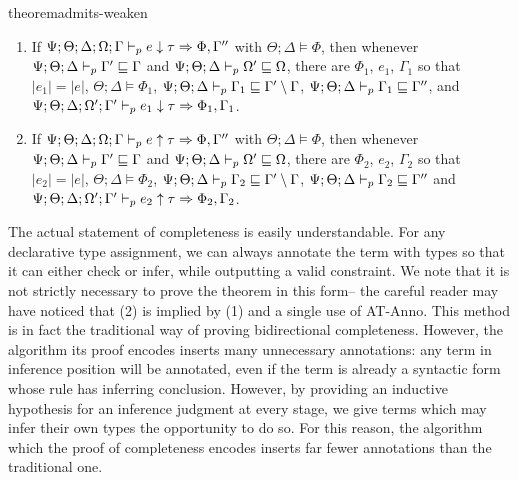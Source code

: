 \begin{restatable}{theorem}{admits-weaken}
~\begin{enumerate}
  \item If $\Psi ; \Theta ; \Delta ; \Omega ; \Gamma \vdash_p e \downarrow \tau \Rightarrow \Phi,\Gamma''$ with $\Theta ; \Delta \vDash \Phi$, then whenever $\Psi ; \Theta ; \Delta \vdash_p \Gamma' \sqsubseteq \Gamma$ and $\Psi ; \Theta ; \Delta \vdash_p \Omega' \sqsubseteq \Omega$, there are $\Phi_1$, $e_1$, $\Gamma_1$ so that $|e_1| = |e|$, $\Theta ; \Delta \vDash \Phi_1$, $\Psi ; \Theta ; \Delta \vdash_p \Gamma_1 \sqsubseteq \Gamma' \setminus \Gamma$, $\Psi ; \Theta ; \Delta \vdash_p \Gamma_1 \sqsubseteq \Gamma''$, and $\Psi ; \Theta ; \Delta ; \Omega' ; \Gamma' \vdash_p e_1 \downarrow \tau \Rightarrow \Phi_1,\Gamma_1$.
  \item If $\Psi ; \Theta ; \Delta ; \Omega ; \Gamma \vdash_p e \uparrow \tau \Rightarrow \Phi,\Gamma''$ with $\Theta ; \Delta \vDash \Phi$, then whenever $\Psi ; \Theta ; \Delta \vdash_p \Gamma' \sqsubseteq \Gamma$ and $\Psi ; \Theta ; \Delta \vdash_p \Omega' \sqsubseteq \Omega$, there are $\Phi_2$, $e_2$, $\Gamma_2$ so that $|e_2| = |e|$, $\Theta ; \Delta \vDash \Phi_2$, $\Psi ; \Theta ; \Delta \vdash_p \Gamma_2 \sqsubseteq \Gamma' \setminus \Gamma$, $\Psi ; \Theta ; \Delta \vdash_p \Gamma_2 \sqsubseteq \Gamma''$ and $\Psi ; \Theta ; \Delta ; \Omega' ; \Gamma' \vdash_p e_2 \uparrow \tau \Rightarrow \Phi_2,\Gamma_2$.
\end{enumerate}
\label{thm:admits-weaken}
\end{restatable}

The actual statement of completeness is easily understandable. For any declarative type assignment, we can always annotate the term with types so that it can either check or infer, while outputting a valid constraint. We note that it is not strictly necessary to prove the theorem in this form-- the careful reader may have noticed that (2) is implied by (1) and a single use of AT-Anno. This method is in fact the traditional way of proving bidirectional completeness. However, the algorithm its proof encodes inserts many unnecessary annotations: any term in inference position will be annotated, even if the term is already a syntactic form whose rule has inferring conclusion. However, by providing an inductive hypothesis for an inference judgment at every stage, we give terms which may infer their own types the opportunity to do so. For this reason, the algorithm which the proof of completeness encodes inserts far fewer annotations than the traditional one.

